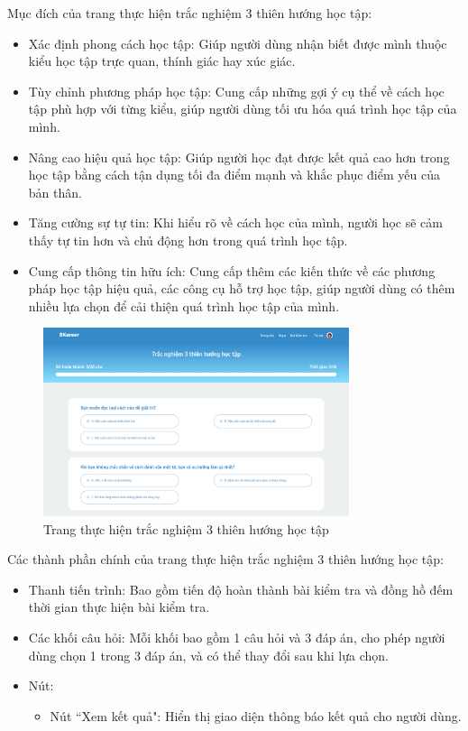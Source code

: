 Mục đích của trang thực hiện trắc nghiệm 3 thiên hướng học tập:
\begin{itemize}
    \item Xác định phong cách học tập: Giúp người dùng nhận biết được mình thuộc kiểu học tập trực quan, thính giác hay xúc giác.
    \item Tùy chỉnh phương pháp học tập: Cung cấp những gợi ý cụ thể về cách học tập phù hợp với từng kiểu, giúp người dùng tối ưu hóa quá trình học tập của mình.
    \item Nâng cao hiệu quả học tập: Giúp người học đạt được kết quả cao hơn trong học tập bằng cách tận dụng tối đa điểm mạnh và khắc phục điểm yếu của bản thân.
    \item Tăng cường sự tự tin: Khi hiểu rõ về cách học của mình, người học sẽ cảm thấy tự tin hơn và chủ động hơn trong quá trình học tập.
    \item Cung cấp thông tin hữu ích: Cung cấp thêm các kiến thức về các phương pháp học tập hiệu quả, các công cụ hỗ trợ học tập, giúp người dùng có thêm nhiều lựa chọn để cải thiện quá trình học tập của mình.
\end{itemize}

\begin{figure}[H]
    \centering
    \includegraphics[width=0.8\textwidth]
    {images/chap5/learningStyle.png}
    \vspace{0.5cm}
    \caption{Trang thực hiện trắc nghiệm 3 thiên hướng học tập}
\end{figure}

Các thành phần chính của trang thực hiện trắc nghiệm 3 thiên hướng học tập:
\begin{itemize}
    \item Thanh tiến trình: Bao gồm tiến độ hoàn thành bài kiểm tra và đồng hồ đếm thời gian thực hiện bài kiểm tra.
    \item Các khối câu hỏi: Mỗi khối bao gồm 1 câu hỏi và 3 đáp án, cho phép người dùng chọn 1 trong 3 đáp án, và có thể thay đổi sau khi lựa chọn.
    \item Nút:
        \begin{itemize}
            \item Nút ``Xem kết quả": Hiển thị giao diện thông báo kết quả cho người dùng.
        \end{itemize}
\end{itemize}


